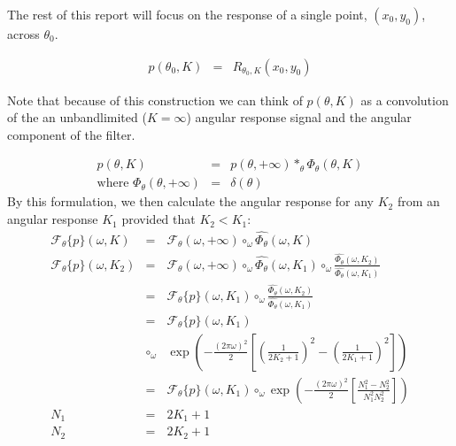 \documentclass{article}
\begin{document}
The rest of this report will focus on the response of a single point, $ (x_0,y_0) $, across $ \theta_0 $.

\begin{eqnarray}
    p(\theta_0,K) & = & R_{\theta_0,K}(x_0,y_0)
\end{eqnarray}

Note that because of this construction we can think of $ p(\theta,K) $ as a convolution of the an unbandlimited ($K = \infty $) angular response signal and the angular component of the filter.

\begin{eqnarray}
    p(\theta,K) & = & p(\theta,+\infty) \ast_\theta \Phi_\theta(\theta,K) \\
    \mbox{where } \Phi_\theta(\theta,+\infty) & = & \delta({\theta}) 
\end{eqnarray}
By this formulation, we then calculate the angular response for any $ K_2 $ from an angular response $ K_1 $ provided that $ K_2 < K_1 $:
\begin{eqnarray}
    \mathcal{F}_\theta\{ p \}(\omega,K) & = & \mathcal{F}_\theta(\omega,+\infty) \circ_\omega \widehat{\Phi_\theta}(\omega,K) \\
    \mathcal{F}_\theta\{ p \}(\omega,K_2) & = & \mathcal{F}_\theta(\omega,+\infty) \circ_\omega \widehat{\Phi_\theta}(\omega,K_1) \circ_\omega \frac{ \widehat{\Phi_\theta}(\omega,K_2) }{ \widehat{\Phi_\theta}(\omega,K_1)  } \\
    & = &  \mathcal{F}_\theta\{ p \}(\omega,K_1) \circ_\omega \frac{ \widehat{\Phi_\theta}(\omega,K_2) }{ \widehat{\Phi_\theta}(\omega,K_1)  } \\
    & = & \mathcal{F}_\theta\{ p \}(\omega,K_1) \nonumber\\ 
    & \circ_\omega & \exp\left(- \frac{(2\pi\omega)^2}{2}  \left[ \left(\frac{1}{2K_2+1}\right)^2 - \left(\frac{1}{2K_1+1}\right)^2 \right] \right) \label{eqn:phi_k2_k1} \\
    & = & \mathcal{F}_\theta\{ p \}(\omega,K_1)
    \circ_\omega   \exp\left(- \frac{(2\pi\omega)^2}{2}  \left[ \frac{N_1^2 - N_2^2}{N_1^2 N_2^2} \right] \right) \\
    N_1 & = & 2K_1 + 1 \\
    N_2 & = & 2K_2 + 1 
\end{eqnarray}
\end{document}
